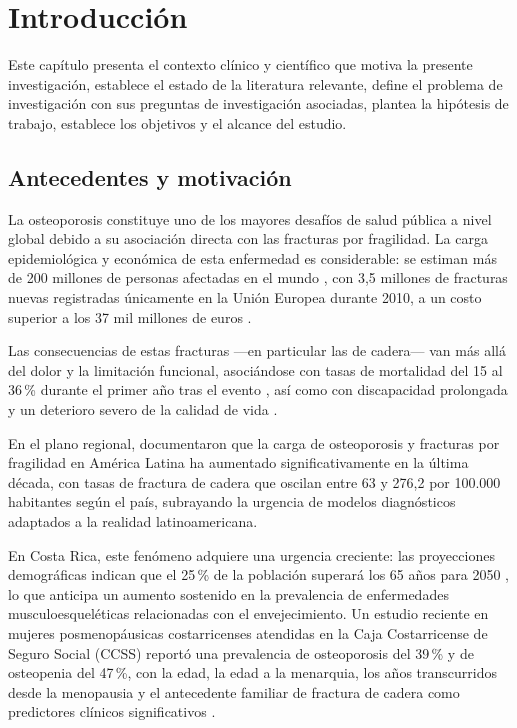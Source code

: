 \documentclass[../tesis.tex]{subfiles}
\begin{document}
\chapter{Introducción}
\label{introduction}

Este capítulo presenta el contexto clínico y científico que motiva la presente investigación, establece el estado de la literatura relevante, define el problema de investigación con sus preguntas de investigación asociadas, plantea la hipótesis de trabajo, establece los objetivos y el alcance del estudio.

\section{Antecedentes y motivación}
\label{antecedentes}

La osteoporosis constituye uno de los mayores desafíos de salud pública a nivel global debido a su asociación directa con las fracturas por fragilidad. La carga epidemiológica y económica de esta enfermedad es considerable: se estiman más de 200 millones de personas afectadas en el mundo \cite{Johnell2006}, con 3{,}5 millones de fracturas nuevas registradas únicamente en la Unión Europea durante 2010, a un costo superior a los 37 mil millones de euros \cite{Kanis2019}.

Las consecuencias de estas fracturas ---en particular las de cadera--- van más allá del dolor y la limitación funcional, asociándose con tasas de mortalidad del 15 al 36\,\% durante el primer año tras el evento \cite{Sebro2022}, así como con discapacidad prolongada y un deterioro severo de la calidad de vida \cite{Kanis2019, CerdasPerez2026}.

En el plano regional, \textcite{Medina2025} documentaron que la carga de osteoporosis y fracturas por fragilidad en América Latina ha aumentado significativamente en la última década, con tasas de fractura de cadera que oscilan entre 63 y 276{,}2 por 100.000 habitantes según el país, subrayando la urgencia de modelos diagnósticos adaptados a la realidad latinoamericana.

En Costa Rica, este fenómeno adquiere una urgencia creciente: las proyecciones demográficas indican que el 25\,\% de la población superará los 65 años para 2050 \cite{INEC2024}, lo que anticipa un aumento sostenido en la prevalencia de enfermedades musculoesqueléticas relacionadas con el envejecimiento. Un estudio reciente en mujeres posmenopáusicas costarricenses atendidas en la Caja Costarricense de Seguro Social (CCSS) reportó una prevalencia de osteoporosis del 39\,\% y de osteopenia del 47\,\%, con la edad, la edad a la menarquia, los años transcurridos desde la menopausia y el antecedente familiar de fractura de cadera como predictores clínicos significativos \cite{CastroGamboa2022}.
\end{document}
